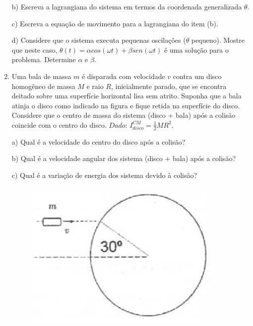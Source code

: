 \begin{enumerate}[start=1,label={\bfseries Q\arabic*.}]
\resposta

b) Escreva a lagrangiana do sistema em termos da coordenada generalizada $\theta$.

\resposta

c) Escreva a equação de movimento para a lagrangiana do item (b).

\resposta

d) Considere que o sistema executa pequenas oscilações ($\theta$ pequeno). Mostre que neste caso, $\theta(t) = \alpha cos(\omega t) + \beta sen( \omega t)$ é uma solução para o problema. Determine $\alpha$ e $\beta$.

\resposta


\item Uma bala de massa $m$ é disparada com velocidade $v$ contra um disco homogêneo de massa $M$ e raio $R$, inicialmente parado, que se encontra deitado sobre uma superfície horizontal lisa sem atrito. Suponha que a bala atinja o disco como indicado na figura e fique retida na superfície do disco. Considere que o centro de massa do sistema (disco + bala) após a colisão coincide com o centro do disco. $Dado$: $I_{disco}^{CM} = \frac{1}{2} M R^{2}$.

a) Qual é a velocidade do centro do disco após a colisão?

\resposta

b) Qual é a velocidade angular dos sistema (disco + bala) após a colisão?

\resposta

c) Qual é a variação de energia dos sistema devido à colisão?

\begin{figure}[H]
\centering
\includegraphics[scale=0.7]{classica-img/angular2.png}
\end{figure}

\resposta


\end{enumerate}
